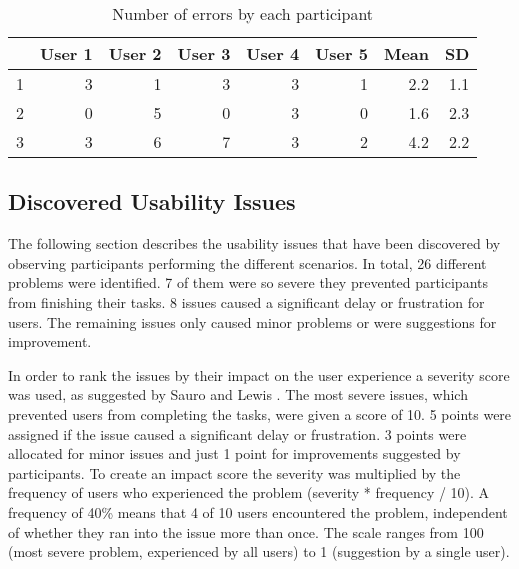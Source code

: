 
\begin{table}[h!]
\begin{tabular}{|r|r|r|r|r|r|r|r|}
\hline
\rowcolor[HTML]{EFEFEF}
\multicolumn{1}{|l|}{\cellcolor[HTML]{EFEFEF}\textbf{Scenario}} & \multicolumn{1}{l|}{\cellcolor[HTML]{EFEFEF}\textbf{User 1}} & \multicolumn{1}{l|}{\cellcolor[HTML]{EFEFEF}\textbf{User 2}} & \multicolumn{1}{l|}{\cellcolor[HTML]{EFEFEF}\textbf{User 3}} & \multicolumn{1}{l|}{\cellcolor[HTML]{EFEFEF}\textbf{User 4}} & \multicolumn{1}{l|}{\cellcolor[HTML]{EFEFEF}\textbf{User 5}} & \multicolumn{1}{l|}{\cellcolor[HTML]{EFEFEF}\textbf{Mean}} & \multicolumn{1}{l|}{\cellcolor[HTML]{EFEFEF}\textbf{SD}} \\ \hline
\cellcolor[HTML]{EFEFEF}1 & 3 & 1 & 3 & 3 & 1 & 2.2 & 1.1 \\ \hline
\cellcolor[HTML]{EFEFEF}2 & 0 & 5 & 0 & 3 & 0 & 1.6 & 2.3 \\ \hline
\cellcolor[HTML]{EFEFEF}3 & 3 & 6 & 7 & 3 & 2 & 4.2 & 2.2 \\ \hline
\end{tabular}
\centering
\caption{Number of errors by each participant}
\label{table:error-rate}
\end{table}

\subsection{Discovered Usability Issues} \label{sec:usability-issues-1st-study}
The following section describes the usability issues that have been discovered by observing participants performing the different scenarios. In total, 26 different problems were identified. 7 of them were so severe they prevented participants from finishing their tasks. 8 issues caused a significant delay or frustration for users. The remaining issues only caused minor problems or were suggestions for improvement.

In order to rank the issues by their impact on the user experience a severity score was used, as suggested by Sauro and Lewis \cite{sauro_quantifying_2012}. The most severe issues, which prevented users from completing the tasks, were given a score of 10. 5 points were assigned if the issue caused a significant delay or frustration. 3 points were allocated for minor issues and just 1 point for improvements suggested by participants. To create an impact score the severity was multiplied by the frequency of users who experienced the problem (severity * frequency / 10). A frequency of 40\% means that 4 of 10 users encountered the problem, independent of whether they ran into the issue more than once. The scale ranges from 100 (most severe problem, experienced by all users) to 1 (suggestion by a single user).

